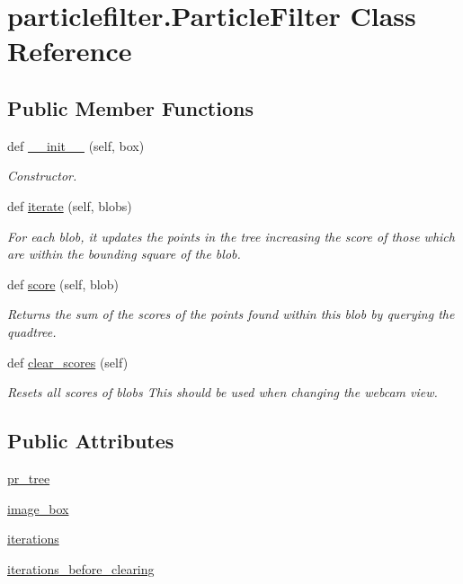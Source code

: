 \section{particlefilter.\+Particle\+Filter Class Reference}
\label{classparticlefilter_1_1ParticleFilter}
\subsection*{Public Member Functions}
\begin{DoxyCompactItemize}
\item 
def \hyperlink{classparticlefilter_1_1ParticleFilter_a6948f5fd9e23311a5d852d4cee9fcd74}{\+\_\+\+\_\+init\+\_\+\+\_\+} (self, box)
\begin{DoxyCompactList}\small\item\em Constructor. \end{DoxyCompactList}\item 
def \hyperlink{classparticlefilter_1_1ParticleFilter_a712cbf35d447e829bee6eb3511d6ed84}{iterate} (self, blobs)
\begin{DoxyCompactList}\small\item\em For each blob, it updates the points in the tree increasing the score of those which are within the bounding square of the blob. \end{DoxyCompactList}\item 
def \hyperlink{classparticlefilter_1_1ParticleFilter_a14d4400ba16d6413f279baa8d0aaff2d}{score} (self, blob)
\begin{DoxyCompactList}\small\item\em Returns the sum of the scores of the points found within this blob by querying the quadtree. \end{DoxyCompactList}\item 
def \hyperlink{classparticlefilter_1_1ParticleFilter_a23de668d643dfd03ef021b18129be7ec}{clear\+\_\+scores} (self)
\begin{DoxyCompactList}\small\item\em Resets all scores of blobs This should be used when changing the webcam view. \end{DoxyCompactList}\end{DoxyCompactItemize}
\subsection*{Public Attributes}
\begin{DoxyCompactItemize}
\item 
\hyperlink{classparticlefilter_1_1ParticleFilter_ad105183603f7e2a9b31ad9b51a904876}{pr\+\_\+tree}
\item 
\hyperlink{classparticlefilter_1_1ParticleFilter_a057adc68ef8ba14478db6e8a453eca32}{image\+\_\+box}
\item 
\hyperlink{classparticlefilter_1_1ParticleFilter_a6bb442d25bc95fd1174e0f1f65a5b059}{iterations}
\item 
\hyperlink{classparticlefilter_1_1ParticleFilter_a3aee419fa01abd6a08a0b512a79d5123}{iterations\+\_\+before\+\_\+clearing}
\end{DoxyCompactItemize}


